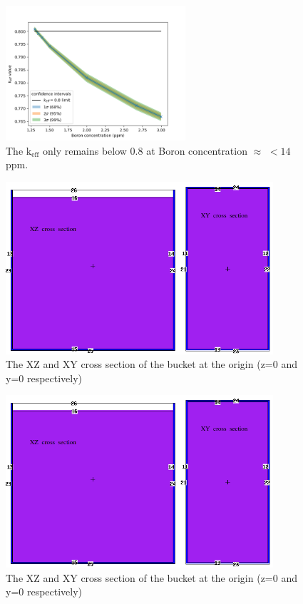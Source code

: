 \documentclass[a4paper, 12pt]{article}
\begin{document}
\begin{figure}[H]
\centering
\includegraphics[height=5cm]{ConfidenceInterval.png}
\caption{The $\text{k}_{\text{eff}}$ only remains below 0.8 at Boron concentration $\approx$ $<14$ ppm.
}\label{ConfInt}
\end{figure}

\begin{appendices}

\begin{figure}[H]
\centering
\includegraphics[height=6.4cm]{Ex1CrxSx.png}
\caption{The XZ and XY cross section of the bucket at the origin (z=0 and y=0 respectively)
}\label{Ex1CrxSx}
\end{figure}

\begin{figure}[H]
\centering
\includegraphics[height=6.4cm]{Ex1CrxSx.png}
\caption{The XZ and XY cross section of the bucket at the origin (z=0 and y=0 respectively)
}\label{Ex3CrxSx}
\end{figure}


\end{appendices}
\end{document}
